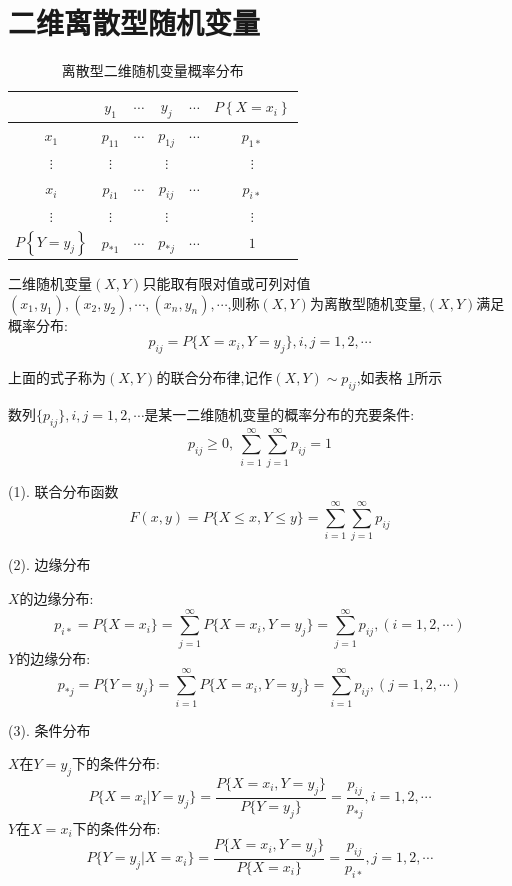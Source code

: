\section{二维离散型随机变量}
\begin{table}[h]
	\centering
	\setlength{\tabcolsep}{10pt}
	\begin{tabular}[h]{c|cccc|c}
		\hline
		\diagbox{$X$}{$Y$} & $y_{1}$ & $\cdots$ & $y_{j}$ & $\cdots$ & $P\left\lbrace X=x_{i}\right\rbrace $ \\
		\hline
		$x_{1}$ & $p_{11}$ & $\cdots$ & $p_{1j}$ & $\cdots$ & $p_{1*}$ \\
		$\vdots$ & $\vdots$ &  & $\vdots$ &  & $\vdots$ \\
		$x_{i}$ & $p_{i1}$ & $\cdots$ & $p_{ij}$ & $\cdots$ & $p_{i*}$\\
		$\vdots$ & $\vdots$ &  & $\vdots$ &  & $\vdots$ \\
		\hline
		$P\left\lbrace Y=y_{j}\right\rbrace $ & $p_{*1}$ & $\cdots$ & $p_{*j}$ & $\cdots$ & $1$\\
		\hline
	\end{tabular}
	\caption{离散型二维随机变量概率分布}
	\label{table: "离散型二维随机变量概率分布"}
\end{table}
\begin{definition}[二维离散型随机变量]
	
	二维随机变量$(X,Y)$只能取有限对值或可列对值$(x_{1},y_{1}),(x_{2},y_{2}),\cdots,(x_{n},y_{n}),\cdots$,则称$(X,Y)$为离散型随机变量,$(X,Y)$满足概率分布: 
	$$p_{ij}=P\{X=x_{i},Y=y_{j}\},i,j=1,2,\cdots$$
	
	上面的式子称为$(X,Y)$的联合分布律,记作$(X,Y)\sim p_{ij}$,如表格 \ref{table: "离散型二维随机变量概率分布"}所示
	
	$\text{数列}\{p_{ij}\},i,j=1,2,\cdots\text{是某一二维随机变量的概率分布的充要条件: }$
	$$ p_{ij}\geq 0,\ \sum\limits_{i=1}^{\infty}\sum\limits_{j=1}^{\infty}p_{ij}=1$$
	
	
	(1). 联合分布函数
	$$F(x,y)=P\{X\leq x,Y\leq y\}=\sum\limits_{i=1}^{\infty}\sum\limits_{j=1}^{\infty}p_{ij}$$
	
	(2). 边缘分布
	
	$X$的边缘分布: 
	$$p_{i*}=P\{X=x_{i}\}=\sum\limits_{j=1}^{\infty}P\{X=x_{i},Y=y_{j}\}=\sum\limits_{j=1}^{\infty}p_{ij},(i=1,2,\cdots)$$
	$Y$的边缘分布: 
	$$p_{*j}=P\{Y=y_{j}\}=\sum\limits_{i=1}^{\infty}P\{X=x_{i},Y=y_{j}\}=\sum\limits_{i=1}^{\infty}p_{ij},(j=1,2,\cdots)$$
	
	(3). 条件分布
	
	$X$在$Y=y_{j}$下的条件分布: 
	$$P\{X=x_{i}|Y=y_{j}\}=\dfrac{P\{X=x_{i},Y=y_{j}\}}{P\{Y=y_{j}\}}=\dfrac{p_{ij}}{p_{*j}},i=1,2,\cdots$$
	$Y$在$X=x_{i}$下的条件分布: 
	$$P\{Y=y_{j}|X=x_{i}\}=\dfrac{P\{X=x_{i},Y=y_{j}\}}{P\{X=x_{i}\}}=\dfrac{p_{ij}}{p_{i*}},j=1,2,\cdots$$
\end{definition}
